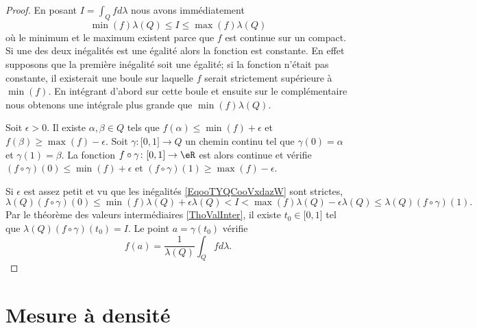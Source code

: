 \begin{proof}
    En posant \( I=\int_Qfd\lambda\) nous avons immédiatement
    \begin{equation}        \label{EqooTYQCooVxdazW}
        \min(f)\lambda(Q)\leq I\leq \max(f)\lambda(Q)
    \end{equation}
    où le minimum et le maximum existent parce que \( f\) est continue sur un compact. Si une des deux inégalités est une égalité alors la fonction est constante. En effet supposons que la première inégalité soit une égalité; si la fonction n'était pas constante, il existerait une boule sur laquelle \( f\) serait strictement supérieure à \( \min(f)\). En intégrant d'abord sur cette boule et ensuite sur le complémentaire nous obtenons une intégrale plus grande que \( \min(f)\lambda(Q)\).

    Soit \( \epsilon>0\). Il existe \( \alpha,\beta\in Q\) tels que \( f(\alpha)\leq\min(f)+\epsilon\) et \( f(\beta)\geq\max(f)-\epsilon\). Soit \( \gamma\colon \mathopen[ 0 , 1 \mathclose]\to Q\) un chemin continu tel que \( \gamma(0)=\alpha\) et \( \gamma(1)=\beta\). La fonction \( f\circ \gamma\colon \mathopen[ 0 , 1 \mathclose]\to \eR\) est alors continue et vérifie \( (f\circ\gamma)(0)\leq \min(f)+\epsilon\) et \( (f\circ\gamma)(1)\geq \max(f)-\epsilon\).

    Si \( \epsilon\) est assez petit et vu que les inégalités \eqref{EqooTYQCooVxdazW} sont strictes,
    \begin{equation}
        \lambda(Q)(f\circ\gamma)(0)\leq \min(f)\lambda(Q)+\epsilon\lambda(Q)<I<\max(f)\lambda(Q)-\epsilon\lambda(Q)\leq\lambda(Q)(f\circ \gamma)(1).
    \end{equation}
    Par le théorème des valeurs intermédiaires \ref{ThoValInter}, il existe \( t_0\in\mathopen[ 0 , 1 \mathclose]\) tel que \( \lambda(Q)(f\circ\gamma)(t_0)=I\). Le point \( a=\gamma(t_0)\) vérifie
    \begin{equation}
        f(a)=\frac{1}{ \lambda(Q) }\int_Qfd\lambda.
    \end{equation}
\end{proof}

\section{Mesure à densité}

